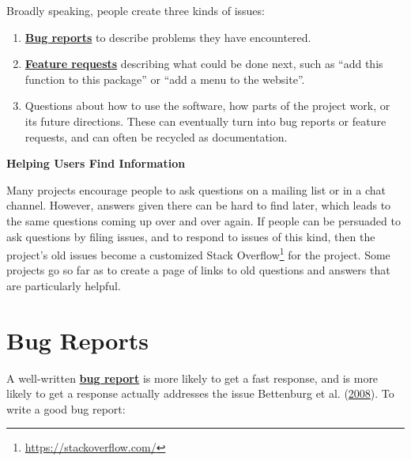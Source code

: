 \documentclass[
]{krantz}
\renewenvironment{quote}{\begin{VF}}{\end{VF}}
\renewcommand{\href}[2]{#2\footnote{\url{#1}}}
\newcommand{\gref}[2]{\hyperlink{#2}{\textbf{#1}}}
\begin{document}
Broadly speaking,
people create three kinds of issues:

\begin{enumerate}
\def\labelenumi{\arabic{enumi}.}
\item
  \gref{Bug reports}{bug\_report} to describe problems they have encountered.
\item
  \gref{Feature requests}{feature\_request}
  describing what could be done next,
  such as ``add this function to this package'' or ``add a menu to the website''.
\item
  Questions about how to use the software,
  how parts of the project work,
  or its future directions.
  These can eventually turn into bug reports or feature requests,
  and can often be recycled as documentation.
\end{enumerate}

\begin{quote}
\textbf{Helping Users Find Information}

Many projects encourage people to ask questions on a mailing list or in a chat channel.
However,
answers given there can be hard to find later,
which leads to the same questions coming up over and over again.
If people can be persuaded to ask questions by filing issues,
and to respond to issues of this kind,
then the project's old issues become a customized \href{https://stackoverflow.com/}{Stack Overflow} for the project.
Some projects go so far as to create a page of links
to old questions and answers that are particularly helpful.
\end{quote}

\hypertarget{teams-bugs}{%
\section{Bug Reports}\label{teams-bugs}}

A well-written \gref{bug report}{bug\_report} is more likely to get a fast response,
and is more likely to get a response actually addresses the issue Bettenburg et al. (\protect\hyperlink{ref-Bett2008}{2008}).
To write a good bug report:
\end{document}
